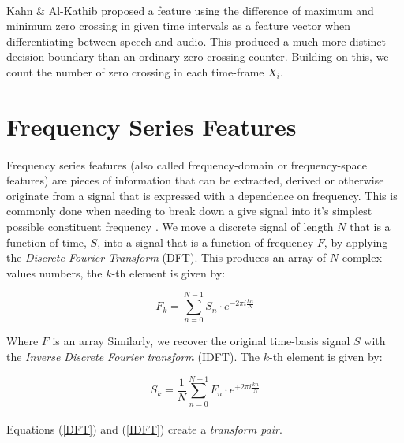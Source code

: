 \documentclass[12pt,letterpaper]{article}
\begin{document}
\paragraph*{}Kahn \& Al-Kathib \cite{Kahn 2006} proposed a feature using the difference of maximum and minimum zero crossing in given time intervals as a feature vector when differentiating between speech and audio. This produced a much more distinct decision boundary than an ordinary zero crossing counter. Building on this, we count the number of zero crossing in each time-frame $X_i$.



\section{Frequency Series Features}

\paragraph*{}Frequency series features (also called frequency-domain or frequency-space features) are pieces of information that can be extracted, derived or otherwise originate from a signal that is expressed with a dependence on frequency. This is commonly done when needing to break down a give signal into it's simplest possible constituent frequency \cite{Peatross 2015}. We move a discrete signal of length $N$ that is a function of time, $S$, into a signal that is a function of frequency $F$, by applying the \textit{Discrete Fourier Transform} (DFT). This produces an array of $N$ complex-values numbers, the $k$-th element is given by:

\begin{equation}
\label{DFT}
F_{k} =  \sum_{n=0}^{N-1} S_{n} \cdot e^{-2\pi i\frac{kn}{N}}
\end{equation}

Where $F$ is an array Similarly, we recover the original time-basis signal $S$ with the \textit{Inverse Discrete Fourier transform} (IDFT). The $k$-th element is given by:

\begin{equation}
\label{IDFT}
S_{k} =  \frac{1}{N}\sum_{n=0}^{N-1} F_{n} \cdot e^{+2\pi i\frac{kn}{N}}
\end{equation}

\paragraph*{}Equations (\ref{DFT}) and (\ref{IDFT}) create a \textit{transform pair}.
\end{document}

